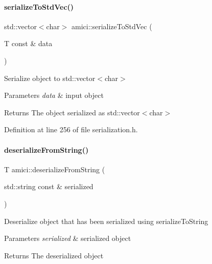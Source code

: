 \mbox{\label{namespaceamici_ad5b38b6ae6007acbaf43521f2a616937}} 
\paragraph{\texorpdfstring{serialize\+To\+Std\+Vec()}{serializeToStdVec()}}
{\footnotesize\ttfamily std\+::vector$<$char$>$ amici\+::serialize\+To\+Std\+Vec (\begin{DoxyParamCaption}\item[{T const \&}]{data }\end{DoxyParamCaption})}

Serialize object to std\+::vector$<$char$>$


\begin{DoxyParams}{Parameters}
{\em data} & input object\\
\hline
\end{DoxyParams}
\begin{DoxyReturn}{Returns}
The object serialized as std\+::vector$<$char$>$
\end{DoxyReturn}


Definition at line 256 of file serialization.\+h.

\mbox{\label{namespaceamici_a863d35f9934623bc5f7f409a05fa0d67}} 
\paragraph{\texorpdfstring{deserialize\+From\+String()}{deserializeFromString()}}
{\footnotesize\ttfamily T amici\+::deserialize\+From\+String (\begin{DoxyParamCaption}\item[{std\+::string const \&}]{serialized }\end{DoxyParamCaption})}

Deserialize object that has been serialized using serialize\+To\+String


\begin{DoxyParams}{Parameters}
{\em serialized} & serialized object\\
\hline
\end{DoxyParams}
\begin{DoxyReturn}{Returns}
The deserialized object
\end{DoxyReturn}


